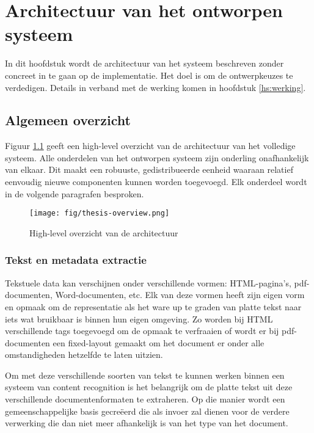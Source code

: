 \chapter{Architectuur van het ontworpen systeem}\label{hs:architectuur}

In dit hoofdstuk wordt de architectuur van het systeem beschreven zonder concreet in
te gaan op de implementatie. Het doel is om de ontwerpkeuzes te verdedigen. Details in verband met de werking komen in hoofdstuk \ref{hs:werking}. 

\section{Algemeen overzicht}

Figuur \ref{fig:overzicht-architectuur} geeft een high-level overzicht van de architectuur van het volledige systeem. Alle onderdelen van het ontworpen systeem zijn onderling onafhankelijk van elkaar. Dit maakt een robuuste, gedistribueerde eenheid waaraan relatief eenvoudig nieuwe componenten kunnen worden toegevoegd. Elk onderdeel wordt in de volgende paragrafen besproken.

\begin{figure}[h]
	\caption{High-level overzicht van de architectuur}
	\label{fig:overzicht-architectuur}
	
	\texttt{[image: fig/thesis-overview.png]}
\end{figure}

\subsection{Tekst en metadata extractie}
Tekstuele data kan verschijnen onder verschillende vormen: HTML-pagina's, pdf-documenten, Word-documenten, etc. Elk van deze vormen heeft zijn eigen vorm en opmaak om de representatie als het ware up te graden van platte tekst naar iets wat bruikbaar is binnen hun eigen omgeving. Zo worden bij HTML verschillende tags toegevoegd om de opmaak te verfraaien of wordt er bij pdf-documenten een fixed-layout gemaakt om het document er onder alle omstandigheden hetzelfde te laten uitzien. 

Om met deze verschillende soorten van tekst te kunnen werken binnen een systeem van content recognition is het belangrijk om de platte tekst uit deze verschillende documentenformaten te extraheren. Op die manier wordt een gemeenschappelijke basis gecre\"eerd die als invoer zal dienen voor de verdere verwerking die dan niet meer afhankelijk is van het type van het document.

